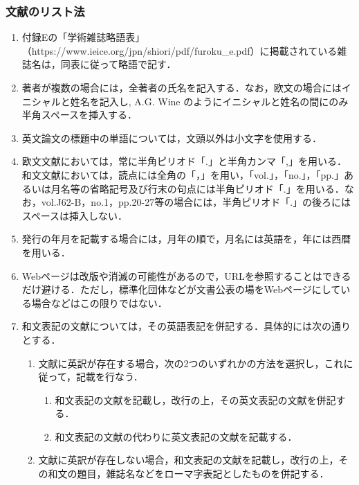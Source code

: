 \subsubsection{文献のリスト法}
\begin{enumerate}
  \item{付録Eの「学術雑誌略語表」（https://www.ieice.org/jpn/shiori/pdf/furoku\_e.pdf）に掲載されている雑誌名は，同表に従って略語で記す．}
  \item{著者が複数の場合には，全著者の氏名を記入する．なお，欧文の場合にはイニシャルと姓名を記入し, A.G. Wine のようにイニシャルと姓名の間にのみ半角スペースを挿入する．}
  \item{英文論文の標題中の単語については，文頭以外は小文字を使用する．}
  \item{欧文文献においては，常に半角ピリオド「.」と半角カンマ「,」を用いる．和文文献においては，読点には全角の「，」を用い，「vol.」，「no.」，「pp.」あるいは月名等の省略記号及び行末の句点には半角ピリオド「.」を用いる．なお，vol.J62-B，no.1，pp.20-27等の場合には，半角ピリオド「.」の後ろにはスペースは挿入しない．}
  \item{発行の年月を記載する場合には，月年の順で，月名には英語を，年には西暦を用いる．}
  \item{Webページは改版や消滅の可能性があるので，URLを参照することはできるだけ避ける．ただし，標準化団体などが文書公表の場をWebページにしている場合などはこの限りではない．}
  \item{和文表記の文献については，その英語表記を併記する．具体的には次の通りとする．}
  \begin{enumerate}
    \item{文献に英訳が存在する場合，次の2つのいずれかの方法を選択し，これに従って，記載を行なう．}
    \begin{enumerate}
      \item{和文表記の文献を記載し，改行の上，その英文表記の文献を併記する．}
      \item{和文表記の文献の代わりに英文表記の文献を記載する．}
    \end{enumerate}
  \item{文献に英訳が存在しない場合，和文表記の文献を記載し，改行の上，その和文の題目，雑誌名などをローマ字表記としたものを併記する．}
  \end{enumerate}
\end{enumerate}